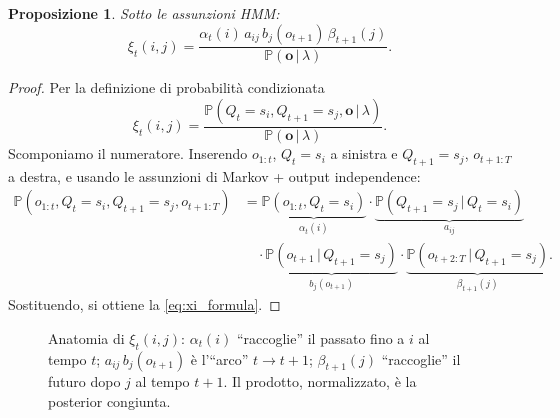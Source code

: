 \documentclass[11pt,a4paper,oneside]{book}
\theoremstyle{plain}
\newtheorem{proposizione}[teorema]{Proposizione}
\theoremstyle{definition}
\theoremstyle{remark}
\newcommand{\Prob}{\mathbb{P}}
\newcommand{\hmm}{\lambda}                   %
\newcommand{\Tlen}{T}                        %
\newcommand{\seqobs}{\mathbf{o}}             %
\newcommand{\fwd}{\alpha}                    %
\newcommand{\bwd}{\beta}                     %
\newcommand{\xig}{\xi}                       %
\newcommand{\given}{\,\vert\,}
\begin{document}
\begin{proposizione}\label{prop:xi}
Sotto le assunzioni HMM:
\begin{equation}
\xig_t(i,j)
= \frac{\fwd_t(i)\,a_{ij}\,b_j(o_{t+1})\,\bwd_{t+1}(j)}
       {\Prob(\seqobs\given\hmm)}.
\label{eq:xi_formula}
\end{equation}
\end{proposizione}

\begin{proof}
Per la definizione di probabilità condizionata
\[
\xig_t(i,j) =
\frac{\Prob(Q_t=s_i, Q_{t+1}=s_j, \seqobs \given\hmm)}{\Prob(\seqobs\given\hmm)}.
\]
Scomponiamo il numeratore. Inserendo $o_{1:t}$, $Q_t=s_i$ a sinistra e
$Q_{t+1}=s_j$, $o_{t+1:\Tlen}$ a destra, e usando le assunzioni di
Markov + output independence:
\begin{align*}
\Prob(o_{1:t},Q_t=s_i,Q_{t+1}=s_j,o_{t+1:\Tlen})
&= \underbrace{\Prob(o_{1:t},Q_t=s_i)}_{\fwd_t(i)} \cdot
   \underbrace{\Prob(Q_{t+1}=s_j\given Q_t=s_i)}_{a_{ij}} \\
&\quad\cdot \underbrace{\Prob(o_{t+1}\given Q_{t+1}=s_j)}_{b_j(o_{t+1})} \cdot
   \underbrace{\Prob(o_{t+2:\Tlen}\given Q_{t+1}=s_j)}_{\bwd_{t+1}(j)}.
\end{align*}
Sostituendo, si ottiene la \eqref{eq:xi_formula}.
\end{proof}

\begin{figure}[h!]
\centering
{}
\caption{Anatomia di $\xig_t(i,j)$: $\fwd_t(i)$ ``raccoglie'' il
passato fino a $i$ al tempo $t$; $a_{ij}\,b_j(o_{t+1})$ è l'``arco''
$t\to t+1$; $\bwd_{t+1}(j)$ ``raccoglie'' il futuro dopo $j$ al tempo
$t+1$. Il prodotto, normalizzato, è la posterior congiunta.}
\label{fig:xi_diag}
\end{figure}
\end{document}
